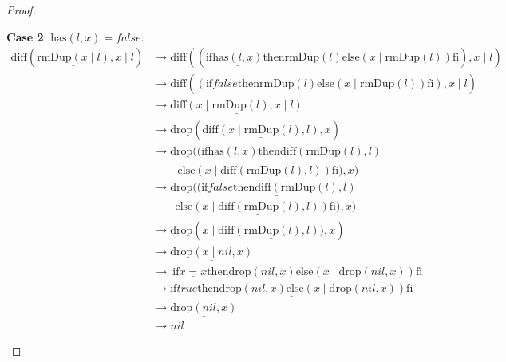 \documentclass[12pt, a4paper]{article}
\newcommand{\rel}[1]{\mathrel{#1}}
\newcommand{\rmx}[1]{\mathrm{#1}}
\newcommand{\larrow}{\longrightarrow}
\newcommand{\under}{\underline}
\begin{document}
\begin{proof}
\begin{description}
\textbf{Case 2}: $\rmx{has}(l, x) = false$.
\begin{align*}
\rmx{diff}(\under{\rmx{rmDup}(x \mid l)}, x \mid l)
	&\larrow \rmx{diff}((\rel{\rmx{if}} \under{\rmx{has}(l, x)} \rel{\rmx{then}} \rmx{rmDup}(l) \rel{\rmx{else}} (x \mid \rmx{rmDup}(l)) \rel{\rmx{fi}}), x \mid l) \tag{by rmDup2} \\
	&\larrow \rmx{diff}(\under{(\rel{\rmx{if}} false \rel{\rmx{then}} \rmx{rmDup}(l) \rel{\rmx{else}} (x \mid \rmx{rmDup}(l)) \rel{\rmx{fi}})}, x \mid l) \tag{by case splitting} \\
	&\larrow \under{\rmx{diff}(x \mid \rmx{rmDup}(l), x \mid l)} \tag{by if2} \\
	&\larrow \rmx{drop}(\under{\rmx{diff}(x \mid \rmx{rmDup}(l), l)}, x) \tag{by Problem 14} \\
	&\larrow \rmx{drop}((\rel{\rmx{if}} \under{\rmx{has}(l, x)} \rel{\rmx{then}} \rmx{diff}(\rmx{rmDup}(l), l) \\ 
	&\quad \quad\ \rel{\rmx{else}} (x \mid \rmx{diff}(\rmx{rmDup}(l), l)) \rel{\rmx{fi}}), x) \tag{by diff2} \\
	&\larrow \rmx{drop}(\under{(\rel{\rmx{if}} false \rel{\rmx{then}} \rmx{diff}(\rmx{rmDup}(l), l)} \\ 
	&\quad \quad \under{\rel{\rmx{else}} (x \mid \rmx{diff}(\rmx{rmDup}(l), l)) \rel{\rmx{fi}})}, x) \tag{by case splitting} \\
	&\larrow \rmx{drop}(x \mid \under{\rmx{diff}(\rmx{rmDup}(l), l))}, x) \tag{by if2} \\
	&\larrow \under{\rmx{drop}(x \mid nil, x)} \tag{by IH} \\
	&\larrow\ \rel{\rmx{if}} \under{x = x} \rel{\rmx{then}} \rmx{drop}(nil, x) \rel{\rmx{else}} (x \mid \rmx{drop}(nil, x)) \rel{\rmx{fi}} \tag{by drop2} \\
	&\larrow \under{\rel{\rmx{if}} true \rel{\rmx{then}} \rmx{drop}(nil, x) \rel{\rmx{else}} (x \mid \rmx{drop}(nil, x)) \rel{\rmx{fi}}} \tag{by equality} \\
	&\larrow \under{\rmx{drop}(nil, x)} \tag{by if1} \\
	&\larrow nil \tag{by drop1}
\end{align*}
\end{description}
\end{proof}
\end{document}
